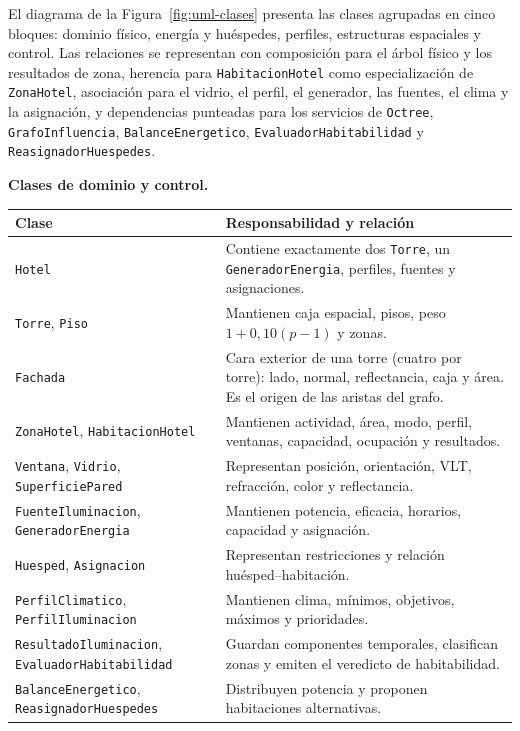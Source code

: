 \documentclass[12pt,a4paper]{article}
\newcommand{\clase}[1]{\texttt{#1}}
\begin{document}
El diagrama de la Figura~\ref{fig:uml-clases} presenta las clases agrupadas en cinco bloques: dominio físico, energía y huéspedes, perfiles, estructuras espaciales y control. Las relaciones se representan con composición para el árbol físico y los resultados de zona, herencia para \clase{HabitacionHotel} como especialización de \clase{ZonaHotel}, asociación para el vidrio, el perfil, el generador, las fuentes, el clima y la asignación, y dependencias punteadas para los servicios de \clase{Octree}, \clase{GrafoInfluencia}, \clase{BalanceEnergetico}, \clase{EvaluadorHabitabilidad} y \clase{ReasignadorHuespedes}.

\textbf{Clases de dominio y control.}

\begin{center}\small
\begin{tabular}{p{}p{}}
\toprule
\textbf{Clase} & \textbf{Responsabilidad y relación}\\
\midrule
\clase{Hotel} & Contiene exactamente dos \clase{Torre}, un \clase{GeneradorEnergia}, perfiles, fuentes y asignaciones.\\
\clase{Torre}, \clase{Piso} & Mantienen caja espacial, pisos, peso $1+0,10(p-1)$ y zonas.\\
\clase{Fachada} & Cara exterior de una torre (cuatro por torre): lado, normal, reflectancia, caja y área. Es el origen de las aristas del grafo.\\
\clase{ZonaHotel}, \clase{HabitacionHotel} & Mantienen actividad, área, modo, perfil, ventanas, capacidad, ocupación y resultados.\\
\clase{Ventana}, \clase{Vidrio}, \clase{SuperficiePared} & Representan posición, orientación, VLT, refracción, color y reflectancia.\\
\clase{FuenteIluminacion}, \clase{GeneradorEnergia} & Mantienen potencia, eficacia, horarios, capacidad y asignación.\\
\clase{Huesped}, \clase{Asignacion} & Representan restricciones y relación huésped--habitación.\\
\clase{PerfilClimatico}, \clase{PerfilIluminacion} & Mantienen clima, mínimos, objetivos, máximos y prioridades.\\
\clase{ResultadoIluminacion}, \clase{EvaluadorHabitabilidad} & Guardan componentes temporales, clasifican zonas y emiten el veredicto de habitabilidad.\\
\clase{BalanceEnergetico}, \clase{ReasignadorHuespedes} & Distribuyen potencia y proponen habitaciones alternativas.\\

\end{tabular}
\end{center}
\end{document}
